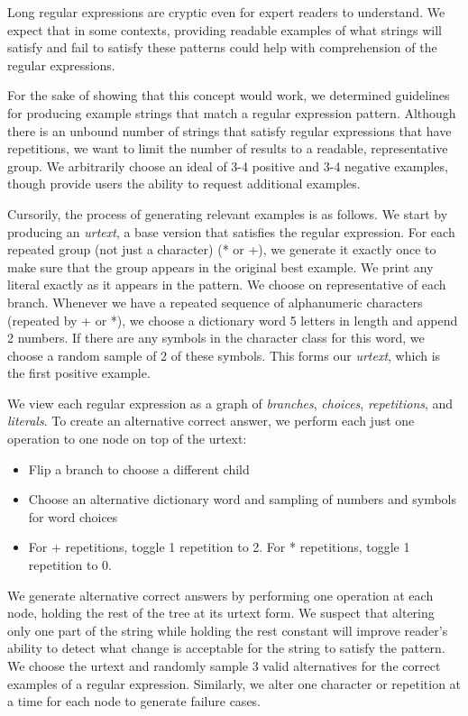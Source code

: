 Long regular expressions are cryptic even for expert readers to understand.
We expect that in some contexts, providing readable examples of what strings will satisfy and fail to satisfy these patterns could help with comprehension of the regular expressions.

For the sake of showing that this concept would work, we determined guidelines for producing example strings that match a regular expression pattern.
Although there is an unbound number of strings that satisfy regular expressions that have repetitions, we want to limit the number of results to a readable, representative group.
We arbitrarily choose an ideal of 3-4 positive and 3-4 negative examples, though provide users the ability to request additional examples.

Cursorily, the process of generating relevant examples is as follows.
We start by producing an \emph{urtext}, a base version that satisfies the regular expression.
For each repeated group (not just a character) (* or +), we generate it exactly once to make sure that the group appears in the original best example.
We print any literal exactly as it appears in the pattern.
We choose on representative of each branch.
Whenever we have a repeated sequence of alphanumeric characters (repeated by + or *), we choose a dictionary word 5 letters in length and append 2 numbers.
If there are any symbols in the character class for this word, we choose a random sample of 2 of these symbols.
This forms our \emph{urtext}, which is the first positive example.

We view each regular expression as a graph of \emph{branches}, \emph{choices}, \emph{repetitions}, and \emph{literals}.
To create an alternative correct answer, we perform each just one operation to one node on top of the urtext:
\begin{itemize}
\item Flip a branch to choose a different child
\item Choose an alternative dictionary word and sampling of numbers and symbols for word choices
\item For + repetitions, toggle 1 repetition to 2.  For * repetitions, toggle 1 repetition to 0.
\end{itemize}

We generate alternative correct answers by performing one operation at each node, holding the rest of the tree at its urtext form.
We suspect that altering only one part of the string while holding the rest constant will improve reader's ability to detect what change is acceptable for the string to satisfy the pattern.
We choose the urtext and randomly sample 3 valid alternatives for the correct examples of a regular expression.
Similarly, we alter one character or repetition at a time for each node to generate failure cases.

